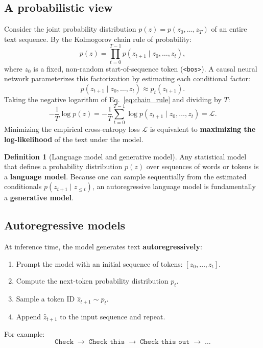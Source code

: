 \documentclass[11pt,a4paper]{article}
\newcommand{\slides}[1]{\par\nopagebreak\noindent{\normalfont\small\emph{(slides #1)}}\par\nopagebreak\vspace{2pt}}
\theoremstyle{definition}
\newtheorem{definition}{Definition}[section]
\theoremstyle{plain}
\begin{document}
\subsection{A probabilistic view}\slides{13 / 84}
Consider the joint probability distribution $p(z) = p(z_0, \dots, z_T)$ of an entire text sequence. By the Kolmogorov chain rule of probability:
\begin{equation}\label{eq:chain_rule}
p(z) = \prod_{t=0}^{T-1} p(z_{t+1} \mid z_0, \dots, z_t),
\end{equation}
where $z_0$ is a fixed, non-random start-of-sequence token (\texttt{<bos>}).
A causal neural network parameterizes this factorization by estimating each conditional factor:
\begin{equation}
p(z_{t+1} \mid z_0, \dots, z_t) \approx p_t(z_{t+1}).
\end{equation}
Taking the negative logarithm of Eq.~\eqref{eq:chain_rule} and dividing by $T$:
\begin{equation}
-\frac{1}{T} \log p(z) = -\frac{1}{T} \sum_{t=0}^{T-1} \log p(z_{t+1} \mid z_0, \dots, z_t) = \mathcal{L}.
\end{equation}
Minimizing the empirical cross-entropy loss $\mathcal{L}$ is equivalent to \textbf{maximizing the log-likelihood} of the text under the model.
\begin{definition}[Language model and generative model]
Any statistical model that defines a probability distribution $p(z)$ over sequences of words or tokens is a \textbf{language model}. Because one can sample sequentially from the estimated conditionals $p(z_{t+1} \mid z_{\le t})$, an autoregressive language model is fundamentally a \textbf{generative model}.
\end{definition}

\subsection{Autoregressive models}\slides{14 / 84}
At inference time, the model generates text \textbf{autoregressively}:
\begin{enumerate}[nosep]
\item Prompt the model with an initial sequence of tokens: $[z_0, \dots, z_t]$.
\item Compute the next-token probability distribution $p_t$.
\item Sample a token ID $\hat{z}_{t+1} \sim p_t$.
\item Append $\hat{z}_{t+1}$ to the input sequence and repeat.
\end{enumerate}
For example:
\begin{equation*}
\texttt{Check} \;\longrightarrow\; \texttt{Check this} \;\longrightarrow\; \texttt{Check this out} \;\longrightarrow\; \dots
\end{equation*}
\end{document}
